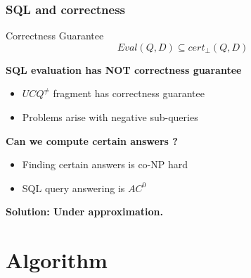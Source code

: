 \documentclass{beamer}
\begin{document}
		\begin{frame}
			\frametitle{SQL and correctness}
			\begin{block}{Correctness Guarantee}
				$$Eval(Q,D) \subseteq cert_\bot(Q,D)$$
			\end{block}
			\pause
				\textbf{SQL evaluation has NOT correctness guarantee}
			\begin{itemize}
				\item $UCQ^{\neq}$ fragment has correctness guarantee
				\item Problems arise with negative sub-queries
			
			\end{itemize}
			\pause
			\bigskip
				\textbf{Can we compute certain answers ?}
				\begin{itemize}
						\item Finding certain answers is co-NP hard
						\item SQL query answering is $AC^0$
				\end{itemize}
					\bigskip
			\pause
			\textbf{Solution: Under approximation.}
		\end{frame}
		
		\section{Algorithm}
		
\end{document}
